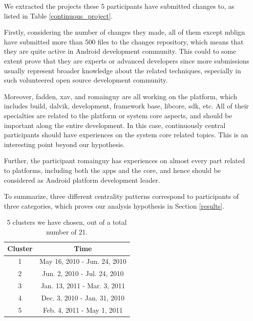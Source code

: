 \documentclass[10pt, conference, compsocconf]{IEEEtran}
\begin{document}
We extracted the projects these 5 participants have submitted changes
to, as listed in Table \ref{continuous_project}.


Firstly, considering the number of changes they made, all of them
except mblign have submitted more than 500 files to the changes
repository, which means that they are quite active in Android
development community. This could to some extent prove that they are
experts or advanced developers since more submissions usually
represent broader knowledge about the related techniques, especially
in such volunteered open source development community.


Moreover, fadden, xav, and romainguy are all working on the platform,
which includes build, dalvik, development, framework base, libcore,
sdk, etc. All of their specialties are related to the platform or
system core aspects, and should be important along the entire
development. In this case, continuously central participants should
have experiences on the system core related topics. This is an
interesting point beyond our hypothesis.


Further, the participant romainguy has experiences on almost every
part related to platforms, including both the apps and the core, and
hence should be considered as Android platform development leader.


To summarize, three different centrality patterns correspond to
participants of three categories, which proves our analysis hypothesis
in Section \ref{results}.


\begin{table}[!t]
\centering
\caption{5 clusters we have chosen, out of a total number of 21.}
\begin{tabular}{|c|c|}
\hline
Cluster & Time  \\
\hline
1 & May 16, 2010 - Jun. 24, 2010 \\
\hline
2 & Jun. 2, 2010 - Jul. 24, 2010  \\
\hline
3 & Jan. 13, 2011 - Mar. 3, 2011 \\
\hline
4 & Dec. 3, 2010 - Jan. 31, 2010 \\
\hline
5 & Feb. 4, 2011 - May 1, 2011 \\
\hline
\end{tabular}
\label{cluster_list}
\end{table}
\end{document}
